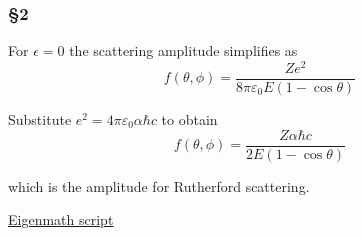 \subsubsection*{\S2}
For $\epsilon=0$ the scattering amplitude simplifies as
\begin{equation*}
f(\theta,\phi)=\frac{Ze^2}{8\pi\varepsilon_0E(1-\cos\theta)}
\end{equation*}

Substitute $e^2=4\pi\varepsilon_0\alpha\hbar c$ to obtain
\begin{equation*}
f(\theta,\phi)=\frac{Z\alpha\hbar c}{2E(1-\cos\theta)}
\end{equation*}

which is the amplitude for Rutherford scattering.

\bigskip
\href{https://georgeweigt.github.io/examples/yukawa-potential-demo.html}{Eigenmath script}


